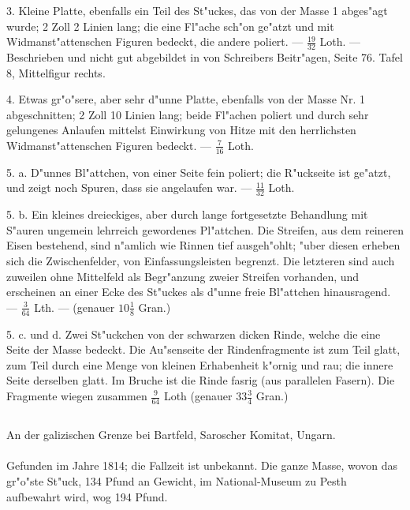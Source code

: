 \documentclass[a4paper, 11pt, oneside, polutonikogreek, german]{article}
\begin{document}
3. Kleine Platte, ebenfalls ein Teil des St"uckes, das von der Masse 1 abges"agt wurde; 2 Zoll 2 Linien lang; die eine Fl"ache sch"on ge"atzt und mit Widmanst"attenschen Figuren bedeckt, die andere poliert. --- $\mathfrak{\frac{19}{32}}$ Loth. --- Beschrieben und nicht gut abgebildet in von Schreibers Beitr"agen, Seite 76. Tafel 8, Mittelfigur rechts.

4. Etwas gr"o"sere, aber sehr d"unne Platte, ebenfalls von der Masse Nr. 1 abgeschnitten; 2 Zoll 10 Linien lang; beide Fl"achen poliert und durch sehr gelungenes Anlaufen mittelst Einwirkung von Hitze mit den herrlichsten Widmanst"attenschen Figuren bedeckt. --- $\mathfrak{\frac{7}{16}}$ Loth.

5. a. D"unnes Bl"attchen, von einer Seite fein poliert; die R"uckseite ist ge"atzt, und zeigt noch Spuren, dass sie angelaufen war. --- $\mathfrak{\frac{11}{32}}$ Loth.

5. b. Ein kleines dreieckiges, aber durch lange fortgesetzte Behandlung mit S"auren ungemein lehrreich gewordenes Pl"attchen. Die Streifen, aus dem reineren Eisen bestehend, sind n"amlich wie Rinnen tief ausgeh"ohlt; "uber diesen erheben sich die Zwischenfelder, von Einfassungsleisten begrenzt. Die letzteren sind auch zuweilen ohne Mittelfeld als Begr"anzung zweier Streifen vorhanden, und erscheinen an einer Ecke des St"uckes als d"unne freie Bl"attchen hinausragend. --- $\mathfrak{\frac{3}{64}}$ Lth. --- (genauer $\mathfrak{10\frac{1}{8}}$ Gran.)

5. c. und d. Zwei St"uckchen von der schwarzen dicken Rinde, welche die eine Seite der Masse bedeckt. Die Au"senseite der Rindenfragmente ist zum Teil glatt, zum Teil durch eine Menge von kleinen Erhabenheit k"ornig und rau; die innere Seite derselben glatt. Im Bruche ist die Rinde fasrig (aus parallelen Fasern). Die Fragmente wiegen zusammen $\mathfrak{\frac{9}{64}}$ Loth (genauer $\mathfrak{33\frac{3}{4}}$ Gran.)
\subsection{}
\begin{center}

An der galizischen Grenze bei Bartfeld, Saroscher Komitat, Ungarn.
\end{center}
\paragraph{}
Gefunden im Jahre 1814; die Fallzeit ist unbekannt. Die ganze Masse, wovon das gr"o"ste St"uck, 134 Pfund an Gewicht, im National-Museum zu Pesth aufbewahrt wird, wog 194 Pfund.
\end{document}
